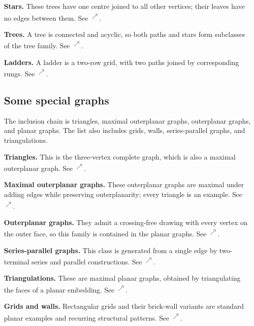 \documentclass[11pt]{article}
\newcommand{\source}[2]{\textsuperscript{\href{https://laxarchive.org/#1/#2.html}{$\nearrow$}}}
\begin{document}
\textbf{Stars.}
These trees have one centre joined to all other vertices;
their leaves have no edges between them. See
\source{lax-68}{Lax68.Stars}.

\textbf{Trees.}
A tree is connected and acyclic, so both paths and stars
form subclasses of the tree family. See \source{lax-68}{Lax68.Trees}.

\textbf{Ladders.}
A ladder is a two-row grid, with two paths joined by
corresponding rungs. See \source{lax-68}{Lax68.Ladders}.
\subsection{Some special graphs}

The inclusion chain is triangles, maximal outerplanar graphs, outerplanar
graphs, and planar graphs. The list also includes grids, walls,
series-parallel graphs, and triangulations.

\textbf{Triangles.}
This is the three-vertex complete graph, which is also a
maximal outerplanar graph. See \source{lax-68}{Lax68.Triangles}.

\textbf{Maximal outerplanar graphs.}
These outerplanar graphs are maximal
under adding edges while preserving outerplanarity; every triangle is an
example. See
\source{lax-68}{Lax68.MaximalOuterplanar}.

\textbf{Outerplanar graphs.}
They admit a crossing-free drawing with every
vertex on the outer face, so this family is contained in the planar graphs. See
\source{lax-68}{Lax68.Outerplanar}.

\textbf{Series-parallel graphs.}
This class is generated from a single edge
by two-terminal series and parallel constructions. See
\source{lax-68}{Lax68.SeriesParallel}.

\textbf{Triangulations.}
These are maximal planar graphs, obtained by
triangulating the faces of a planar embedding. See
\source{lax-68}{Lax68.Triangulations}.

\textbf{Grids and walls.}
Rectangular grids and their brick-wall variants
are standard planar examples and recurring structural patterns. See
\source{lax-68}{Lax68.GridsAndWalls}.
\end{document}
